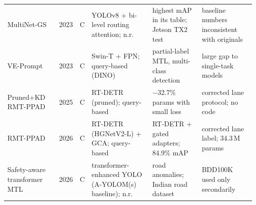 \begin{table}[!htbp]
\begin{tabularx}{\linewidth}{L{2.6cm} c c L{3.6cm} X X}
MultiNet-GS~\cite{li2023multinetgs} & 2023 & C & YOLOv8 + bi-level routing attention; n.r. & highest mAP in its table; Jetson TX2 test & baseline numbers inconsistent with originals \\
VE-Prompt~\cite{liang2023veprompt} & 2023 & C & Swin-T + FPN; query-based (DINO) & partial-label MTL, multi-class detection & large gap to single-task models \\
Pruned+KD RMT-PPAD~\cite{compress2025} & 2025 & C & RT-DETR (pruned); query-based & $-$32.7\% params with small loss & corrected lane protocol; no code \\
RMT-PPAD~\cite{wang2026rmtppad} & 2026 & C & RT-DETR (HGNetV2-L) + GCA; query-based & RT-DETR + gated adapters; 84.9\% mAP & corrected lane label; 34.3\,M params \\
Safety-aware transformer MTL~\cite{selvarajan2026safety} & 2026 & C & transformer-enhanced YOLO (A-YOLOM(s) baseline); n.r. & road anomalies; Indian road dataset & BDD100K used only secondarily \\
\bottomrule
\end{tabularx}
\end{table}

